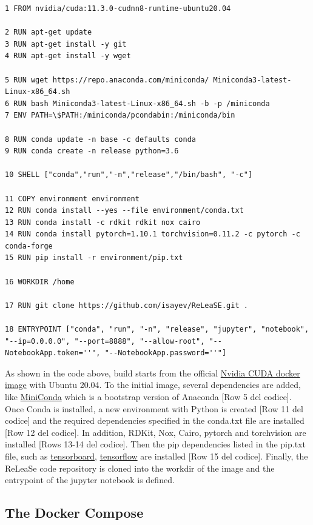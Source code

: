 \documentclass[conference]{IEEEtran}
\begin{document}
\begin{lstlisting}
1 FROM nvidia/cuda:11.3.0-cudnn8-runtime-ubuntu20.04

2 RUN apt-get update
3 RUN apt-get install -y git
4 RUN apt-get install -y wget

5 RUN wget https://repo.anaconda.com/miniconda/ Miniconda3-latest-Linux-x86_64.sh
6 RUN bash Miniconda3-latest-Linux-x86_64.sh -b -p /miniconda
7 ENV PATH=\$PATH:/miniconda/pcondabin:/miniconda/bin

8 RUN conda update -n base -c defaults conda
9 RUN conda create -n release python=3.6

10 SHELL ["conda","run","-n","release","/bin/bash", "-c"]

11 COPY environment environment
12 RUN conda install --yes --file environment/conda.txt
13 RUN conda install -c rdkit rdkit nox cairo
14 RUN conda install pytorch=1.10.1 torchvision=0.11.2 -c pytorch -c conda-forge
15 RUN pip install -r environment/pip.txt

16 WORKDIR /home

17 RUN git clone https://github.com/isayev/ReLeaSE.git .

18 ENTRYPOINT ["conda", "run", "-n", "release", "jupyter", "notebook", "--ip=0.0.0.0", "--port=8888", "--allow-root", "--NotebookApp.token=''", "--NotebookApp.password=''"]
\end{lstlisting}

As shown in the code above, build starts from the official \href{https://hub.docker.com/r/nvidia/cuda}{Nvidia CUDA docker image} with Ubuntu 20.04. To the initial image, several dependencies are added, like \href{https://docs.conda.io/en/latest/miniconda.html}{MiniConda} which is a bootstrap version of Anaconda [Row 5 del codice].
Once Conda is installed, a new environment with Python is created [Row 11 del codice] and the required dependencies specified in the conda.txt file are installed [Row 12 del codice]. In addition, RDKit, Nox, Cairo, pytorch and torchvision are installed [Rows 13-14 del codice]. 
Then the pip dependencies listed in the pip.txt file, such as \href{https://www.tensorflow.org/tensorboard}{tensorboard}, \href{https://www.tensorflow.org/}{tensorflow} are installed [Row 15 del codice].
Finally, the ReLeaSe code repository is cloned into the workdir of the image and the entrypoint of the jupyter notebook is defined.

\subsection{The Docker Compose}\label{sec:The Docker Compose}
\end{document}
